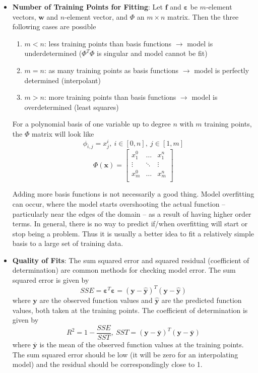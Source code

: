 \documentclass[11pt]{article}
\newcommand{\Item}[1]{\item \textbf{#1}:}
\newcommand{\CenteredBoxed}[1]{\begin{center}\boxed{#1}\end{center}}
\newcommand{\sumlim}[2]{\sum\limits_{#1}^{#2}}
\newcommand{\boldx}{\mathbf{x}}
\begin{document}
\begin{itemize}
\CenteredBoxed{\mathcal{N}_{terms} = \sumlim{q=1}{n}{{q+p-1}\choose{q}} = \sumlim{q=1}{n}\frac{(q+p-1)!}{(q!)(p-1)!}}
\Item{Number of Training Points for Fitting} Let $\bm{f}$ and $\bm{\varepsilon}$ be $m$-element vectors, $\bm{w}$ and $n$-element vector, and $\Phi$ an $m\times n$ matrix. Then the three following cases are possible
	\begin{enumerate}
	\item $m<n$: less training points than basis functions $\to$ model is underdetermined ($\Phi^T\Phi$ is singular and model cannot be fit)
	\item $m=n$: as many training points as basis functions $\to$ model is perfectly determined (interpolant)
	\item $m>n$: more training points than basis functions $\to$ model is overdetermined (least squares)
	\end{enumerate}
For a polynomial basis of one variable up to degree $n$ with $m$ training points, the $\Phi$ matrix will look like
$$\phi_{i,j}=x_j^i,\ i\in[0,n],\ j\in[1,m]$$
\[\Phi(\boldx) =  \begin{bmatrix}
x_1^0 & \dots & x_1^{n}\\
\vdots & \ddots & \vdots\\
x_m^0 & \dots & x_m^n\\
\end{bmatrix}\]

Adding more basis functions is not necessarily a good thing. Model overfitting can occur, where the model starts overshooting the actual function -- particularly near the edges of the domain -- as a result of having higher order terms. In general, there is no way to predict if/when overfitting will start or stop being a problem. Thus it is usually a better idea to fit a relatively simple basis to a large set of training data.
\Item{Quality of Fits} The sum squared error and squared residual (coefficient of determination) are common methods for checking model error. The sum squared error is given by 
$$SSE=\bm{\varepsilon}^T\bm{\varepsilon}=(\bm{y}-\bm{\hat{y}})^T(\bm{y}-\bm{\hat{y}})$$
where $\bm{y}$ are the observed function values and $\bm{\hat{y}}$ are the predicted function values, both taken at the training points. The coefficient of determination is given by
$$R^2=1-\frac{SSE}{SST},\ SST=(\bm{y}-\bm{\bar{y}})^T(\bm{y}-\bm{\bar{y}})$$
where $\bm{\bar{y}}$ is the mean of the observed function values at the training points. The sum squared error should be low (it will be zero for an interpolating model) and the residual should be correspondingly close to 1.\\


\end{itemize}
\end{document}
